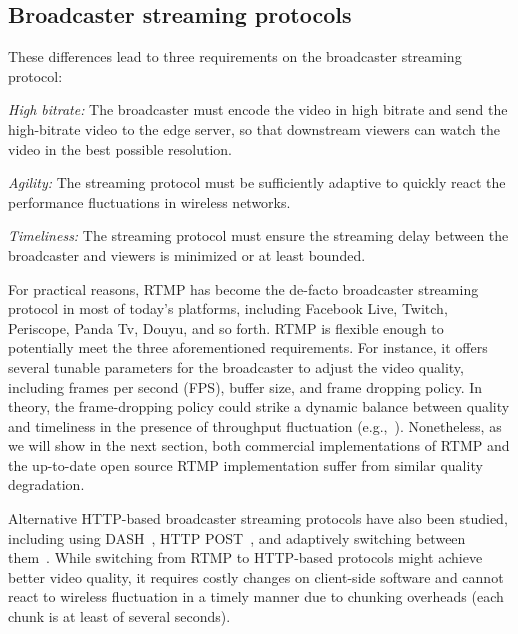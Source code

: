 \subsection{Broadcaster streaming protocols}

These differences lead to three requirements on the broadcaster streaming protocol:

\begin{packedenumerate}

\item {\em High bitrate:} The broadcaster must encode
the video in high bitrate and send the high-bitrate video
to the edge server, so that downstream viewers can watch
the video in the best possible resolution.

\item {\em Agility:} The streaming protocol must be sufficiently adaptive
to quickly react the performance fluctuations in wireless networks.

\item {\em Timeliness:} The streaming protocol must ensure the streaming
delay between the broadcaster and viewers is minimized
or at least bounded.

\end{packedenumerate}

For practical reasons, RTMP has become the de-facto
broadcaster streaming protocol in most of today's platforms,
including Facebook Live, Twitch, Periscope, Panda Tv,
Douyu, and so forth.
RTMP is flexible enough to potentially meet
the three aforementioned requirements.
For instance, it offers several tunable parameters for
the broadcaster to adjust the video quality, including
frames per second (FPS), buffer size, and frame dropping
policy.
In theory, the frame-dropping policy could
strike a dynamic balance between quality and timeliness
in the presence of throughput fluctuation
(e.g.,~\cite{huang2003adaptive,krasic2003quality,singh2004dynamic}).
Nonetheless, as we will show in the next section,
both commercial implementations of RTMP and
the up-to-date open source RTMP implementation suffer from similar quality
degradation.

Alternative HTTP-based broadcaster streaming protocols have also
been studied, including using DASH~\cite{pires2014dash}, HTTP POST~\cite{seo2012experimental},
and adaptively switching between them~\cite{wilk2016leveraging}.
While switching from RTMP to HTTP-based protocols might
achieve better video quality, it requires costly
changes on client-side software and cannot react to wireless
fluctuation in a timely manner due to chunking overheads
(each chunk is at least of
several seconds).


